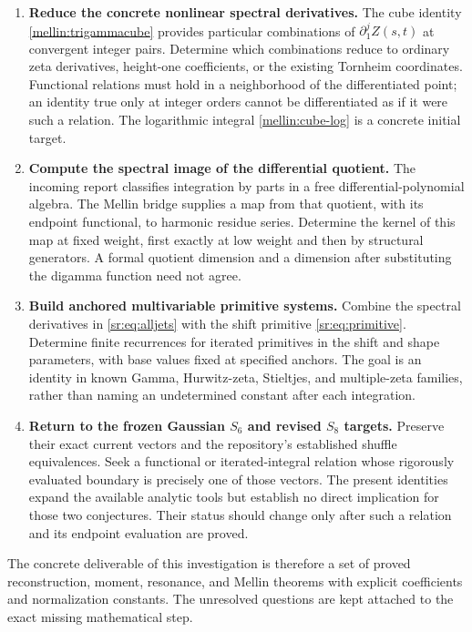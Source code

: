 \begin{enumerate}[leftmargin=*,label=\textbf{Q\arabic*.}]
\item \textbf{Reduce the concrete nonlinear spectral derivatives.}
The cube identity \eqref{mellin:trigammacube} provides particular
combinations of $\partial_1^j Z(s,t)$ at convergent integer pairs.
Determine which combinations reduce to ordinary zeta derivatives,
height-one coefficients, or the existing Tornheim coordinates. Functional
relations must hold in a neighborhood of the differentiated point;
an identity true only at integer orders cannot be differentiated as if
it were such a relation. The logarithmic integral
\eqref{mellin:cube-log} is a concrete initial target.

\item \textbf{Compute the spectral image of the differential quotient.}
The incoming report classifies integration by parts in a free
differential-polynomial algebra. The Mellin bridge supplies a map from
that quotient, with its endpoint functional, to harmonic residue series.
Determine the kernel of this map at fixed weight, first exactly at low
weight and then by structural generators. A formal quotient dimension
and a dimension after substituting the digamma function need not agree.

\item \textbf{Build anchored multivariable primitive systems.}
Combine the spectral derivatives in \eqref{sr:eq:alljets} with the
shift primitive \eqref{sr:eq:primitive}. Determine finite recurrences for
iterated primitives in the shift and shape parameters, with base values
fixed at specified anchors. The goal is an identity in known Gamma,
Hurwitz-zeta, Stieltjes, and multiple-zeta families, rather than naming
an undetermined constant after each integration.

\item \textbf{Return to the frozen Gaussian $S_6$ and revised $S_8$ targets.}
Preserve their exact current vectors and the repository's established
shuffle equivalences. Seek a functional or iterated-integral relation
whose rigorously evaluated boundary is precisely one of those vectors.
The present identities expand the available analytic tools but establish
no direct implication for those two conjectures. Their status should
change only after such a relation and its endpoint evaluation are proved.

\end{enumerate}

The concrete deliverable of this investigation is therefore a set of
proved reconstruction, moment, resonance, and Mellin theorems with
explicit coefficients and normalization constants. The unresolved
questions are kept attached to the exact missing mathematical step.
